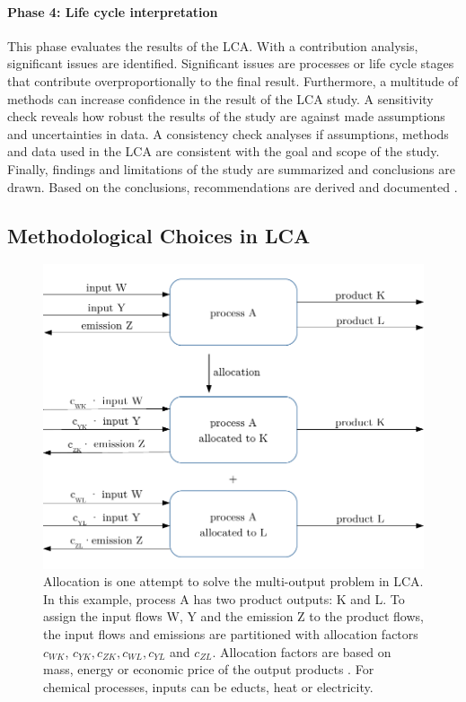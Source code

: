 \paragraph{Phase 4: Life cycle interpretation} This phase evaluates the results of the LCA. With a contribution analysis, significant issues are identified. Significant issues are processes or life cycle stages that contribute overproportionally to the final result. Furthermore, a multitude of methods can increase confidence in the result of the LCA study. A sensitivity check reveals how robust the results of the study are against made assumptions and uncertainties in data. A consistency check analyses if assumptions, methods and data used in the LCA are consistent with the goal and scope of the study. Finally, findings and limitations of the study are summarized and conclusions are drawn. Based on the conclusions, recommendations are derived and documented  \cite{InternationalOrganizationforStandardization.2006b}.

\subsection{Methodological Choices in \acl{LCA}}
\label{multi-output}

\begin{figure}[h]
    \centering
    \includegraphics[]{images/allocation.pdf}
    \caption[Allocation]{Allocation is one attempt to solve the multi-output problem in LCA. In this example, process A has two product outputs: K and L. To assign the input flows W, Y and the emission Z to the product flows, the input flows and emissions are partitioned with allocation factors $c_{WK}$, $c_{YK}, c_{ZK}, c_{WL}, c_{YL}$ and $c_{ZL}$. Allocation factors are based on mass, energy or economic price of the output products \cite{InternationalOrganizationforStandardization.2006}. For chemical processes, inputs can be educts, heat or electricity.}
    \label{fig:allocation}
\end{figure}

